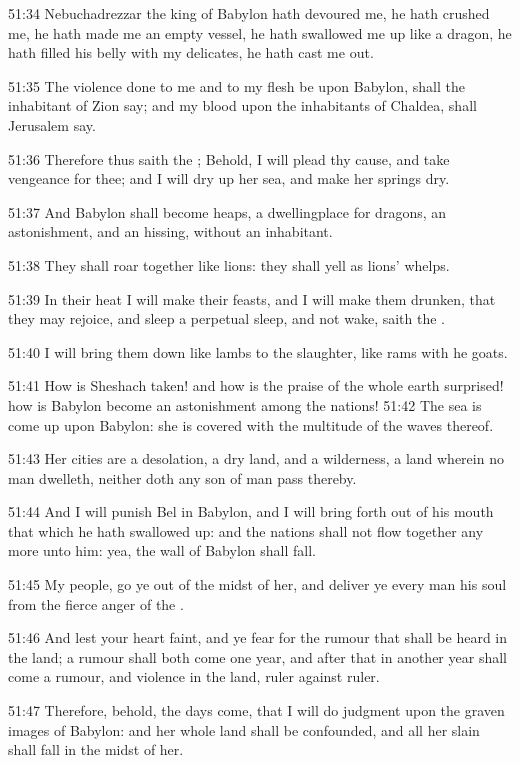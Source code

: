 51:34 Nebuchadrezzar the king of Babylon hath devoured me, he hath crushed me, he hath made me an empty vessel, he hath swallowed me up like a dragon, he hath filled his belly with my delicates, he hath cast me out.

51:35 The violence done to me and to my flesh be upon Babylon, shall the inhabitant of Zion say; and my blood upon the inhabitants of Chaldea, shall Jerusalem say.

51:36 Therefore thus saith the \LORD; Behold, I will plead thy cause, and take vengeance for thee; and I will dry up her sea, and make her springs dry.

51:37 And Babylon shall become heaps, a dwellingplace for dragons, an astonishment, and an hissing, without an inhabitant.

51:38 They shall roar together like lions: they shall yell as lions' whelps.

51:39 In their heat I will make their feasts, and I will make them drunken, that they may rejoice, and sleep a perpetual sleep, and not wake, saith the \LORD.

51:40 I will bring them down like lambs to the slaughter, like rams with he goats.

51:41 How is Sheshach taken! and how is the praise of the whole earth surprised! how is Babylon become an astonishment among the nations!  51:42 The sea is come up upon Babylon: she is covered with the multitude of the waves thereof.

51:43 Her cities are a desolation, a dry land, and a wilderness, a land wherein no man dwelleth, neither doth any son of man pass thereby.

51:44 And I will punish Bel in Babylon, and I will bring forth out of his mouth that which he hath swallowed up: and the nations shall not flow together any more unto him: yea, the wall of Babylon shall fall.

51:45 My people, go ye out of the midst of her, and deliver ye every man his soul from the fierce anger of the \LORD.

51:46 And lest your heart faint, and ye fear for the rumour that shall be heard in the land; a rumour shall both come one year, and after that in another year shall come a rumour, and violence in the land, ruler against ruler.

51:47 Therefore, behold, the days come, that I will do judgment upon the graven images of Babylon: and her whole land shall be confounded, and all her slain shall fall in the midst of her.

